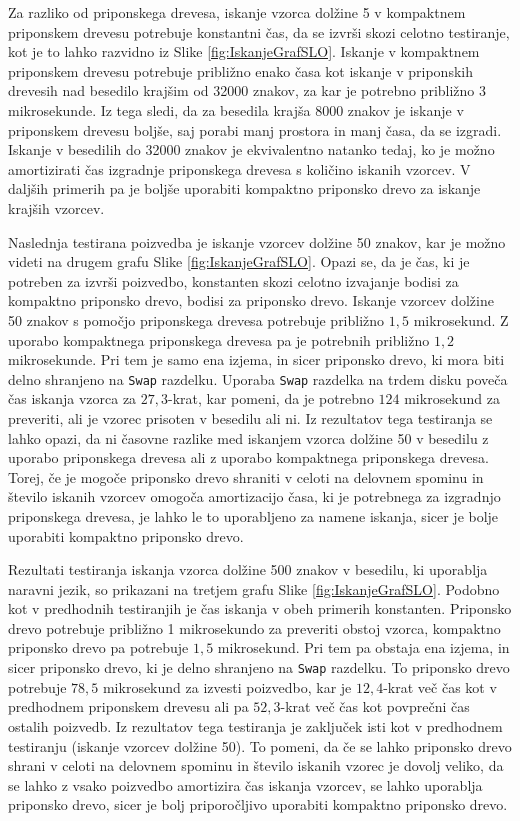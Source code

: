 Za razliko od priponskega drevesa, iskanje vzorca dolžine 5 v kompaktnem priponskem drevesu potrebuje konstantni čas, da se izvrši skozi celotno testiranje, kot je to lahko razvidno iz Slike \ref{fig:IskanjeGrafSLO}. Iskanje v kompaktnem priponskem drevesu potrebuje približno enako časa kot iskanje v priponskih drevesih nad besedilo krajšim od 32000 znakov, za kar je potrebno približno $3$ mikrosekunde. Iz tega sledi, da za besedila krajša 8000 znakov je iskanje v priponskem drevesu boljše, saj porabi manj prostora in manj časa, da se izgradi. Iskanje v besedilih do 32000 znakov je ekvivalentno natanko tedaj, ko je možno amortizirati čas izgradnje priponskega drevesa s količino iskanih vzorcev. V daljših primerih pa je boljše uporabiti kompaktno priponsko drevo za iskanje krajših vzorcev.

Naslednja testirana poizvedba je iskanje vzorcev dolžine 50 znakov, kar je možno videti na drugem grafu Slike \ref{fig:IskanjeGrafSLO}. Opazi se, da je čas, ki je potreben za izvrši poizvedbo, konstanten skozi celotno izvajanje bodisi za kompaktno priponsko drevo, bodisi za priponsko drevo. Iskanje vzorcev dolžine 50 znakov s pomočjo priponskega drevesa potrebuje približno $1,5$ mikrosekund. Z uporabo kompaktnega priponskega drevesa pa je potrebnih približno $1,2$ mikrosekunde. Pri tem je samo ena izjema, in sicer priponsko drevo, ki mora biti delno shranjeno na \verb|Swap| razdelku. Uporaba \verb|Swap| razdelka na trdem disku poveča čas iskanja vzorca za $27,3$-krat, kar pomeni, da je potrebno $124$ mikrosekund za preveriti, ali je vzorec prisoten v besedilu ali ni. Iz rezultatov tega testiranja se lahko opazi, da ni časovne razlike med iskanjem vzorca dolžine 50 v besedilu z uporabo priponskega drevesa ali z uporabo kompaktnega priponskega drevesa. Torej, če je mogoče priponsko drevo shraniti v celoti na delovnem spominu in število iskanih vzorcev omogoča amortizacijo časa, ki je potrebnega za izgradnjo priponskega drevesa, je lahko le to uporabljeno za namene iskanja, sicer je bolje uporabiti kompaktno priponsko drevo.

Rezultati testiranja iskanja vzorca dolžine 500 znakov v besedilu, ki uporablja naravni jezik, so prikazani na tretjem grafu Slike \ref{fig:IskanjeGrafSLO}. Podobno kot v predhodnih testiranjih je čas iskanja v obeh primerih konstanten. Priponsko drevo potrebuje približno 1 mikrosekundo za preveriti obstoj vzorca, kompaktno priponsko drevo pa potrebuje $1,5$ mikrosekund. Pri tem pa obstaja ena izjema, in sicer priponsko drevo, ki je delno shranjeno na \verb|Swap| razdelku. To priponsko drevo potrebuje $78,5$ mikrosekund za izvesti poizvedbo, kar je $12,4$-krat več čas kot v predhodnem priponskem drevesu ali pa $52,3$-krat več čas kot povprečni čas ostalih poizvedb. Iz rezultatov tega testiranja je zaključek isti kot v predhodnem testiranju (iskanje vzorcev dolžine 50). To pomeni, da če se lahko priponsko drevo shrani v celoti na delovnem spominu in število iskanih vzorec je dovolj veliko, da se lahko z vsako poizvedbo amortizira čas iskanja vzorcev, se lahko uporablja priponsko drevo, sicer je bolj priporočljivo uporabiti kompaktno priponsko drevo.

